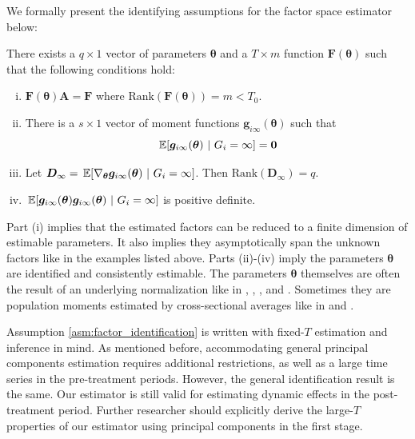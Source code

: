 \documentclass[12pt]{article}
\begin{document}
We formally present the identifying assumptions for the factor space estimator below:
\begin{assumption}\label{asm:factor_identification}
  There exists a $q \times 1$ vector of parameters $\bm \theta$ and a $T \times m$ function $\bm F(\bm \theta)$ such that the following conditions hold:
  \begin{enumerate}[(i)]
    \item $\bm F(\bm \theta) \bm A = \bm F$ where $\text{Rank}(\bm F(\bm \theta)) = m < T_0$.
    \item There is a $s \times 1$ vector of moment functions $\bm g_{i\infty}(\bm \theta)$ such that 
    \begin{equation}\label{eq:factor_moments}
      \expec{\bm g_{i\infty}(\bm \theta)}{G_i = \infty} = \bm 0
    \end{equation}
    
    \item Let $\bm D_{\infty} = \expec{\nabla_{\bm \theta} \bm g_{i \infty}(\bm \theta)}{G_i = \infty}$. Then $\text{Rank}(\bm D_{\infty}) = q$.
    \item $\expec{\bm g_{i \infty}(\bm \theta) \bm g_{i \infty}(\bm \theta)}{G_i = \infty}$ is positive definite. 
  \end{enumerate}
\end{assumption}
Part (i) implies that the estimated factors can be reduced to a finite dimension of estimable parameters. It also implies they asymptotically span the unknown factors like in the examples listed above. Parts (ii)-(iv) imply the parameters $\bm \theta$ are identified and consistently estimable. The parameters $\bm \theta$ themselves are often the result of an underlying normalization like in \citet{Bai_2009}, \citet{Ahn_Lee_Schmidt_2013}, \citet{Juodis_Sarafidis_2022}, and \citet{Callaway_Karami_2020}. Sometimes they are population moments estimated by cross-sectional averages like in \citet{Westerlund_Petrova_Norkute_2019} and \citet{Brown_Schmidt_Wooldridge2021}. 

Assumption \ref{asm:factor_identification} is written with fixed-$T$ estimation and inference in mind. As mentioned before, accommodating general principal components estimation requires additional restrictions, as well as a large time series in the pre-treatment periods. However, the general identification result is the same. Our estimator is still valid for estimating dynamic effects in the post-treatment period. Further researcher should explicitly derive the large-$T$ properties of our estimator using principal components in the first stage. 
\end{document}
